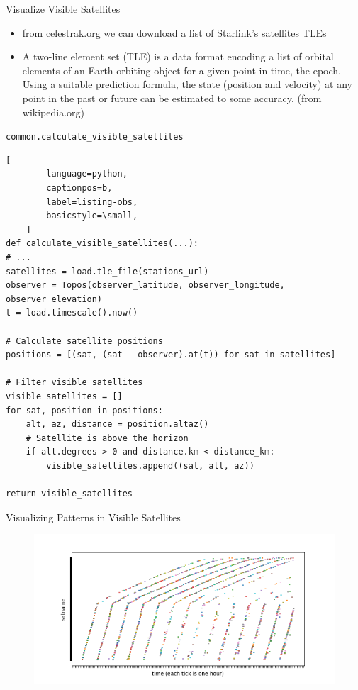 \documentclass[NET,english,beameralt]{tumbeamer}
\begin{document}
\begin{frame}{Visualize Visible Satellites}
\begin{itemize}
    \item from \href{celestrak.org}{celestrak.org} we can download a list of Starlink's satellites TLEs
    \item A two-line element set (TLE) is a data format encoding a list of orbital elements of an Earth-orbiting object
    for a given point in time, the epoch. Using a suitable prediction formula, the state (position and velocity) at any
    point in the past or future can be estimated to some accuracy. (from wikipedia.org)
\end{itemize}
\end{frame}

\begin{frame}[fragile]{\texttt{common.calculate\_visible\_satellites}}
    \begin{lstlisting}[
        language=python,
        captionpos=b,
        label=listing-obs,
        basicstyle=\small,
    ]
def calculate_visible_satellites(...):
# ...
satellites = load.tle_file(stations_url)
observer = Topos(observer_latitude, observer_longitude, observer_elevation)
t = load.timescale().now()

# Calculate satellite positions
positions = [(sat, (sat - observer).at(t)) for sat in satellites]

# Filter visible satellites
visible_satellites = []
for sat, position in positions:
    alt, az, distance = position.altaz()
    # Satellite is above the horizon
    if alt.degrees > 0 and distance.km < distance_km:
        visible_satellites.append((sat, alt, az))

return visible_satellites
    \end{lstlisting}
\end{frame}

\begin{frame}{Visualizing Patterns in Visible Satellites}
    \begin{figure}
        \includegraphics[width=1\textwidth]{pics/patterns-in-satellite-appearances.png}
    \end{figure}
\end{frame}
\end{document}
